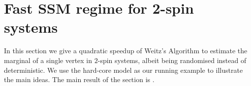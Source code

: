 \documentclass{theoretics}
\newcommand{\eps}{\varepsilon}
\begin{document}
\section{Fast SSM regime for 2-spin systems}
In this section we give a quadratic speedup of Weitz's Algorithm to estimate the marginal of a single vertex in $2$-spin systems, albeit being randomised instead of deterministic.
We use the hard-core model as our running example to illustrate the main ideas.
The main result of the section is .

\end{document}
